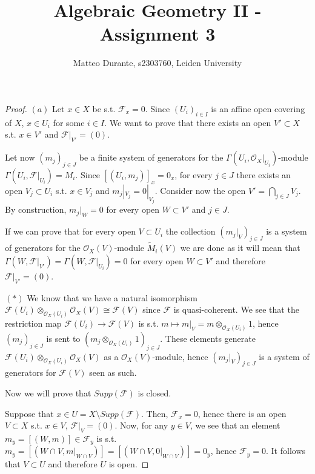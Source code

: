 \documentclass{article}
\newcommand{\exercise}[1]{\noindent {\bf Exercise #1}}
\begin{document}
\title{Algebraic Geometry II - Assignment 3}

\author{Matteo Durante, s2303760, Leiden University}

\maketitle

\exercise{1}

\begin{proof}
    $(a)$ Let $x\in X$ be s.t. $\mathcal{F}_x=0$. Since $(U_i)_{i\in I}$ is an
    affine open covering of $X$, $x\in U_i$ for some $i\in I$. We want to prove
    that there exists an open $V'\subset X$ s.t. $x\in V'$ and
    $\mathcal{F}|_{V'}=(0)$.
    
    Let now $(m_j)_{j\in J}$ be a finite system of generators for the
    $\Gamma(U_i,\mathcal{O}_X|_{U_i})$-module $\Gamma(U_i,\mathcal{F}|_{U_i})=
    M_i$. Since $[(U_i,m_j)]_x=0_x$, for every $j\in J$ there exists an open
    $V_j\subset U_i$ s.t. $x\in V_j$ and $m_j|_{V_j}=0|_{V_j}$. Consider now
    the open $V'=\bigcap_{j\in J}V_j$. By construction, $m_j|_W=0$ for every
    open $W\subset V'$ and $j\in J$.

    If we can prove that for every open $V\subset U_i$ the collection
    $(m_j|_V)_{j\in J}$ is a system of generators for the
    $\mathcal{O}_X(V)$-module $\tilde{M}_i(V)$ we
    are done as it will mean that $\Gamma(W,\mathcal{F}|_{V'})=
    \Gamma(W,\mathcal{F}|_{U_i})=0$ for every open $W\subset V'$ and therefore
    $\mathcal{F}|_{V'}=(0)$.

    $(*)$ We know that we have a natural isomorphism
    $\mathcal{F}(U_i)\otimes_{\mathcal{O}_X(U_i)}\mathcal{O}_X(V)\cong
    \mathcal{F}(V)$ since $\mathcal{F}$ is quasi-coherent. We see that the
    restriction map $\mathcal{F}(U_i)\rightarrow\mathcal{F}(V)$ is s.t.
    $m\mapsto m|_V=m\otimes_{\mathcal{O}_X(U_i)}1$, hence $(m_j)_{j\in J}$ is
    sent to $(m_j\otimes_{\mathcal{O}_X(U_i)}1)_{j\in J}$. These elements
    generate $\mathcal{F}(U_i)\otimes_{\mathcal{O}_X(U_i)}\mathcal{O}_X(V)$ as a
    $\mathcal{O}_X(V)$-module, hence $(m_j|_V)_{j\in J}$ is a system of
    generators for $\mathcal{F}(V)$ seen as such.

    Now we will prove that $Supp(\mathcal{F})$ is closed.

    Suppose that $x\in U=X\setminus Supp(\mathcal{F})$. Then, $\mathcal{F}_x=0$,
    hence there is an open $V\subset X$ s.t. $x\in V$, $\mathcal{F}|_{V}=(0)$.
    Now, for any $y\in V$, we see that an element $m_y=[(W,m)]\in\mathcal{F}_y$
    is s.t. $m_y=[(W\cap V,m|_{W\cap V})]=[(W\cap V,0|_{W\cap V})]=0_y$, hence
    $\mathcal{F}_y=0$. It follows that $V\subset U$ and therefore $U$ is open.
\end{proof}
\end{document}
